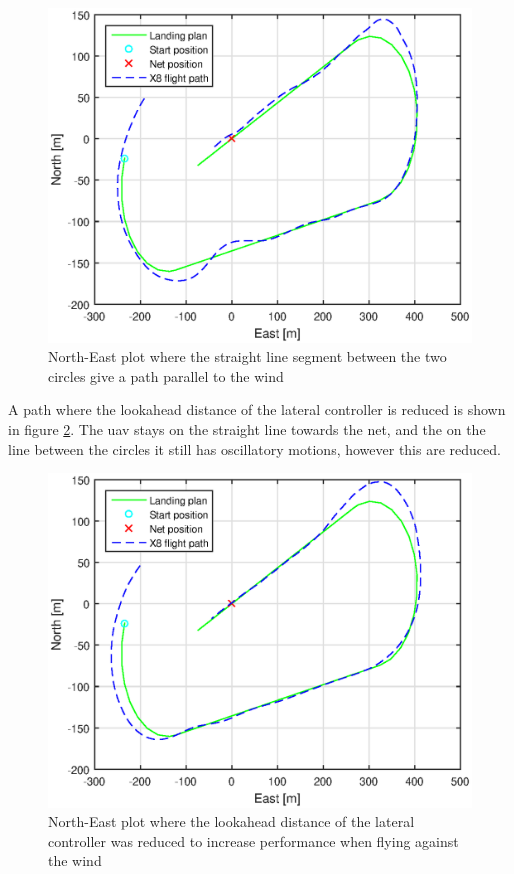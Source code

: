 \begin{figure}[H]
	\centering
	\includegraphics[scale=0.7]{figs/Experiment/NorthEast31mai125420.eps}
	\caption{North-East plot where the straight line segment between the two circles give a path parallel to the wind}
	\label{Fig:NorthEast31mai125420}
\end{figure}
A path where the lookahead distance of the lateral controller is reduced is shown in figure \ref{Fig:NorthEast31mai131844}. The \gls{uav} stays on the straight line towards the net, and the on the line between the circles it still has oscillatory motions, however this are reduced. 
\begin{figure}[H]
\centering
\includegraphics[scale=0.7]{figs/Experiment/NorthEast31mai131844.eps}
\caption{North-East plot where the lookahead distance of the lateral controller was reduced to increase performance when flying against the wind}
\label{Fig:NorthEast31mai131844}
\end{figure}
